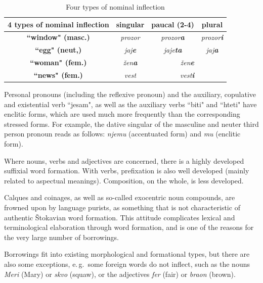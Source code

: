 \begin{multicols}{2}
\begin{table}[ht]
\begin{center}
\renewcommand{\arraystretch}{2.2}
\setlength{\arrayrulewidth}{1pt}
\begin{tabular}{|c|c|c|c|}
\hline
{\textbf{4 types of nominal inflection}} & {\textbf{singular}} & {\textbf{paucal (2-4)}} & {\textbf{plural}} \\
\hline
{\textbf{``window" (masc.)}} & \textit{prozor} & \textit{prozor\textbf{a}} & \textit{prozor\textbf{i}} \\
\hline
{\textbf{``egg" (neut,)}} & \textit{jaj\textbf{e}} & \textit{jaje\textbf{ta}} & \textit{jaj\textbf{a}} \\
\hline
{\textbf{``woman" (fem.)}} & \textit{žen\textbf{a}} & \multicolumn{2}{c|}{\textit{žen\textbf{e}}} \\
\hline
{\textbf{``news" (fem.)}} & \textit{vest} &  \multicolumn{2}{c|}{\textit{vest\textbf{i}}} \\
\hline
\end{tabular}
\end{center}
\caption{Four types of nominal inflection}
 \label{nominal_inflection}
\end{table}

Personal pronouns (including the reflexive pronoun) and the auxiliary, copulative and existential verb ``jesam", as well as the auxiliary verbs ``biti" and ``hteti" have enclitic forms, which are used much more frequently than the corresponding stressed forms. For example, the dative singular of the masculine and neuter third person pronoun reads as follows:  \textit{njemu} (accentuated form) and  \textit{mu} (enclitic form).

Where nouns, verbs and adjectives are concerned, there is a highly developed suffixial word formation. With verbs, prefixation is also well developed (mainly related to aspectual meanings). Composition, on the whole, is less developed.

Calques and coinages, as well as so-called exocentric noun compounds, are frowned upon by language purists, as something that is not characteristic of authentic Štokavian word formation. This attitude complicates lexical and terminological elaboration through word formation, and is one of the reasons for the very large number of borrowings.

Borrowings fit into existing morphological and formational types, but there are also some exceptions, e.\,g.~some foreign words do not inflect, such as the nouns \textit{Meri}  (Mary) or \textit{skvo} (squaw), or the adjectives \textit{fer} (fair) or \textit{braon} (brown). 


\end{multicols}
